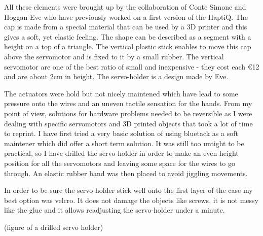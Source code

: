 All these elements were brought up by the collaboration of Conte Simone
and Hoggan Eve who have previously worked on a first version of the
HaptiQ. The cap is made from a special material that can be used by a 3D
printer and this gives a soft, yet elastic feeling. The shape can be
described as a segment with a height on a top of a triangle. The
vertical plastic stick enables to move this cap above the servomotor and
is fixed to it by a small rubber. The vertical servomotor are one of the
best ratio of small and inexpensive - they cost each \euro{12} and are
about 2cm in height. The servo-holder is a design made by Eve.

The actuators were hold but not nicely maintened which have lead to
some pressure onto the wires and an uneven tactile sensation for the hands.
From my point of view, solutions for hardware problems needed to be
reversible as I were dealing with specific servomotors and 3D printed
objects that took a lot of time to reprint. I have first tried a
very basic solution of using bluetack as a soft maintener which
did offer a short term solution. It was still too untight to be
practical, so I have drilled the servo-holder in order to make an even
height position for all the servomotors and leaving some space for the
wires to go through. An elastic rubber band was then placed to avoid
jiggling movements.

In order to be sure the servo holder stick well onto the first layer of
the case my best option was velcro. It does not damage the objects like screws, it
is not messy like the glue and it allows readjusting the servo-holder
under a minute.

(figure of a drilled servo holder)

